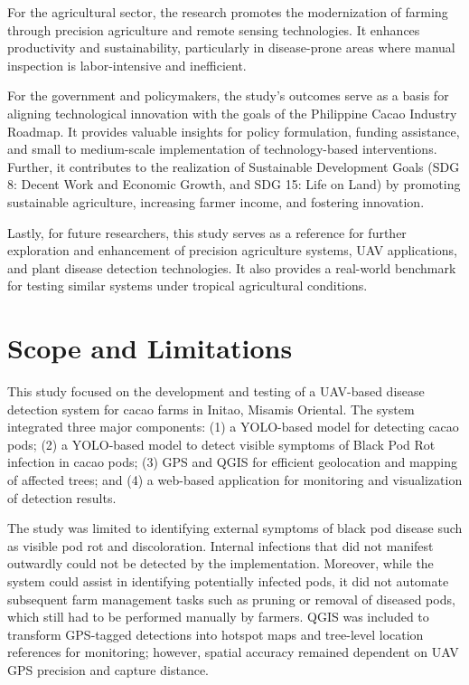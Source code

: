 {For the agricultural sector, the research promotes the modernization of farming through precision agriculture and remote sensing technologies. It enhances productivity and sustainability, particularly in disease-prone areas where manual inspection is labor-intensive and inefficient.

For the government and policymakers, the study’s outcomes serve as a basis for aligning technological innovation with the goals of the Philippine Cacao Industry Roadmap. It provides valuable insights for policy formulation, funding assistance, and small to medium-scale implementation of technology-based interventions. Further, it contributes to the realization of Sustainable Development Goals (SDG 8: Decent Work and Economic Growth, and SDG 15: Life on Land) by promoting sustainable agriculture, increasing farmer income, and fostering innovation.

Lastly, for future researchers, this study serves as a reference for further exploration and enhancement of precision agriculture systems, UAV applications, and plant disease detection technologies. It also provides a real-world benchmark for testing similar systems under tropical agricultural conditions.

\section{Scope and Limitations}
This study focused on the development and testing of a UAV-based disease detection system for cacao farms in Initao, Misamis Oriental. The system integrated three major components: (1) a YOLO-based model for detecting cacao pods; (2) a YOLO-based model to detect visible symptoms of Black Pod Rot infection in cacao pods; (3) GPS and QGIS for efficient geolocation and mapping of affected trees; and (4) a web-based application for monitoring and visualization of detection results.

The study was limited to identifying external symptoms of black pod disease such as visible pod rot and discoloration. Internal infections that did not manifest outwardly could not be detected by the implementation. Moreover, while the system could assist in identifying potentially infected pods, it did not automate subsequent farm management tasks such as pruning or removal of diseased pods, which still had to be performed manually by farmers. QGIS was included to transform GPS-tagged detections into hotspot maps and tree-level location references for monitoring; however, spatial accuracy remained dependent on UAV GPS precision and capture distance.

}
